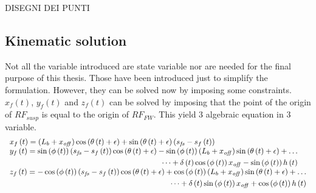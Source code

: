 DISEGNI DEI PUNTI %

\subsection{Kinematic solution}
%
Not all the variable introduced are state variable nor are needed for the final purpose of this thesis. Those have been introduced just to simplify the formulation. However, they can be solved now by imposing some constraints.
$x_f(t)$, $y_f(t)$ and $z_f(t)$ can be solved by imposing that the point of the origin of $RF_{susp}$ is equal to the origin of $RF_{FW}$. This yield 3 algebraic equation in 3 variable.\\
%
\footnotesize
\begin{equation}
    \begin{array}{l} 
        x_{f} \left( t \right) = \left( L_{b}+x_{{
        \it off}} \right) \cos \left( \theta \left( t \right) +\epsilon
         \right) +\sin \left( \theta \left( t \right) +\epsilon \right) 
         \left( s_{{\it fs}}-s_{f} \left( t \right)  \right) \\ 
         \begin{split}
         y_{f} \left( t \right) =\sin \left( \phi \left( t
         \right)  \right)  \left( s_{{\it fs}}-s_{f} \left( t \right) 
         \right) \cos \left( \theta \left( t \right) +\epsilon \right) -\sin
         \left( \phi \left( t \right)  \right)  \left( L_{b}+x_{{\it off}}
         \right) \sin \left( \theta \left( t \right) +\epsilon \right) + \dots 
         \\ \dots +\delta
         \left( t \right) \cos \left( \phi \left( t \right)  \right) x_{{\it 
        off}}-\sin \left( \phi \left( t \right)  \right) h \left( t \right) 
        \end{split} \\ 
        \begin{split}
        z_{f} \left( t \right) =-\cos \left( \phi \left( 
        t \right)  \right)  \left( s_{{\it fs}}-s_{f} \left( t \right) 
         \right) \cos \left( \theta \left( t \right) +\epsilon \right) +\cos
         \left( \phi \left( t \right)  \right)  \left( L_{b}+x_{{\it off}}
         \right) \sin \left( \theta \left( t \right) +\epsilon \right) + \dots
         \\ \dots +\delta
         \left( t \right) \sin \left( \phi \left( t \right)  \right) x_{{\it 
        off}}+\cos \left( \phi \left( t \right)  \right) h \left( t \right) 
        \end{split}
    \end{array}       
\end{equation}
